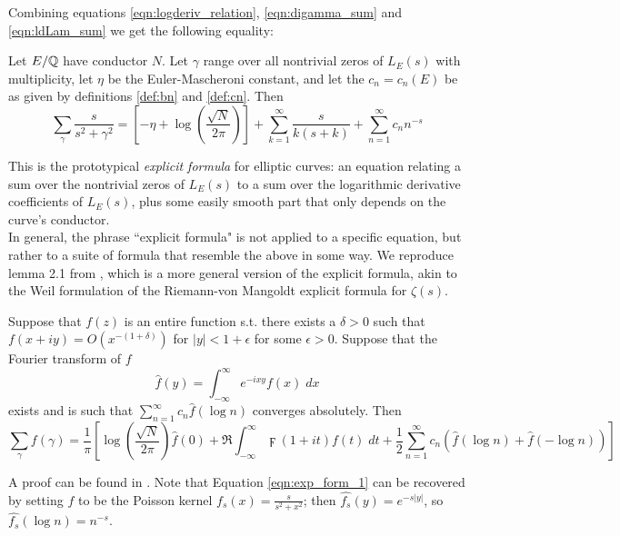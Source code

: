 \documentclass[10pt]{article}
\newcommand{\Les}{L_E(s)}
\begin{document}
Combining equations \ref{eqn:logderiv_relation}, \ref{eqn:digamma_sum} and \ref{eqn:ldLam_sum} we get the following equality:
\begin{proposition}
Let $E/\mathbb{Q}$ have conductor $N$. Let $\gamma$ range over all nontrivial zeros of $\Les$ with multiplicity, let $\eta$ be the Euler-Mascheroni constant, and let the $c_n = c_n(E)$ be as given by definitions \ref{def:bn} and \ref{def:cn}. Then
\begin{equation}\label{eqn:exp_form_1}
\sum_{\gamma} \frac{s}{s^2 + \gamma^2} = \left[-\eta + \log\left(\frac{\sqrt{N}}{2\pi}\right)\right] + \sum_{k=1}^{\infty} \frac{s}{k(s+k)} + \sum_{n=1}^{\infty} c_n n^{-s}
\end{equation}
\end{proposition}
This is the prototypical {\it explicit formula} for elliptic curves: an equation relating a sum over the nontrivial zeros of $\Les$ to a sum over the logarithmic derivative coefficients of $\Les$, plus some easily smooth part that only depends on the curve's conductor. \\

In general, the phrase ``explicit formula" is not applied to a specific equation, but rather to a suite of formula that resemble the above in some way. We reproduce lemma 2.1 from \cite{Bob-2011}, which is a more general version of the explicit formula, akin to the Weil formulation of the Riemann-von Mangoldt explicit formula for $\zeta(s)$.
\begin{lemma}\label{lem:exp_form_2}
Suppose that $f(z)$ is an entire function s.t. there exists a $\delta>0$ such that $f(x+iy) = O(x^{-(1+\delta)})$ for $|y|<1+\epsilon$ for some $\epsilon>0$. Suppose that the Fourier transform of $f$
\begin{equation}
\hat{f}(y) = \int_{-\infty}^{\infty} e^{-i x y}f(x)\; dx
\end{equation}
exists and is such that $\sum_{n=1}^{\infty} c_n \hat{f}\left(\log n\right)$ converges absolutely. Then
\begin{equation}\label{eqn:exp_form_2}
\sum_{\gamma} f(\gamma) = \frac{1}{\pi}\left[\log\left(\frac{\sqrt{N}}{2\pi}\right)\hat{f}(0) + \Re\int_{-\infty}^{\infty} \digamma(1+it)f(t) \; dt  + \frac{1}{2} \sum_{n=1}^{\infty} c_n \left( \hat{f}\left(\log n\right) + \hat{f}\left(-\log n\right)\right) \right]
\end{equation}
\end{lemma}
A proof can be found in \cite[Theorem 5.12]{IwKo-2004}. Note that Equation \ref{eqn:exp_form_1} can be recovered by setting $f$ to be the Poisson kernel $f_s(x) = \frac{s}{s^2+x^2}$; then $\hat{f_s}(y) = e^{-s|y|}$, so $\hat{f_s}(\log n) = n^{-s}$. \\
\end{document}
